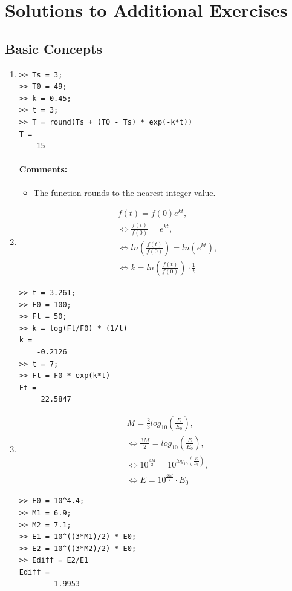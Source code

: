 \chapter*{Solutions to Additional Exercises}
\section*{Basic Concepts}
\begin{enumerate}
\item 
\begin{lstlisting}
>> Ts = 3;
>> T0 = 49;
>> k = 0.45;
>> t = 3;
>> T = round(Ts + (T0 - Ts) * exp(-k*t))
T =
	15
\end{lstlisting}
\subsubsection{Comments:}
\begin{itemize}
\item The  function rounds to the nearest integer value.
\end{itemize}

\item 
\begin{align*}
& f(t) = f(0) e^{kt}, \\
&\Leftrightarrow \frac{f(t)}{f(0)} = e^{kt}, \\
&\Leftrightarrow ln \left( \frac{f(t)}{f(0)} \right) = ln ( e^{kt} ), \\
&\Leftrightarrow k = ln \left( \frac{f(t)}{f(0)} \right) \cdot \frac{1}{t}
\end{align*}
\begin{lstlisting}
>> t = 3.261;
>> F0 = 100;
>> Ft = 50;
>> k = log(Ft/F0) * (1/t)
k = 
	-0.2126
>> t = 7;
>> Ft = F0 * exp(k*t)
Ft =
	 22.5847
\end{lstlisting}

\item
\begin{align*}
& M = \frac{2}{3} log_{10} \left( \frac{E}{E_0} \right), \\
&\Leftrightarrow \frac{3M}{2} = log_{10} \left( \frac{E}{E_0} \right), \\
&\Leftrightarrow 10^{\frac{3M}{2}} = 10^{log_{10} \left( \frac{E}{E_0} \right)}, \\
&\Leftrightarrow E = 10^{\frac{3M}{2}} \cdot E_0
\end{align*}
\begin{lstlisting}
>> E0 = 10^4.4;
>> M1 = 6.9;
>> M2 = 7.1;
>> E1 = 10^((3*M1)/2) * E0;
>> E2 = 10^((3*M2)/2) * E0;
>> Ediff = E2/E1
Ediff =
		1.9953
\end{lstlisting}


\end{enumerate}
